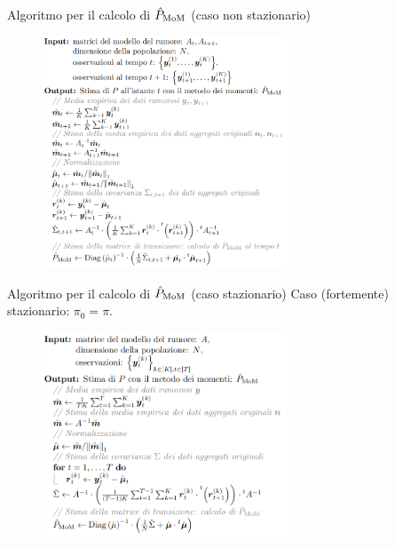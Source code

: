 \documentclass[10pt,xcolor={table,dvipsnames}]{beamer} 		%
\theoremstyle{plain}					%
\theoremstyle{definition}
\theoremstyle{remark}
\begin{document}
	\begin{frame}[fragile]
		{Algoritmo per il calcolo di $\hat{P}_{\textup{MoM}}$ {\smaller (caso non stazionario)}}

		\begin{figure}[ht]
			\centering
			\includegraphics[width=0.65\textwidth]{Immagini/algorithm_nonstationary.png}
		\end{figure}
		
	\end{frame}

	\begin{frame}[fragile]
		{Algoritmo per il calcolo di $\hat{P}_{\textup{MoM}}$ {\smaller (caso stazionario)}}
		Caso {\smaller (fortemente)} stazionario: $\pi_0=\pi$.

		\begin{figure}[ht]
			\centering
			\includegraphics[width=0.65\textwidth]{Immagini/algorithm_stationary.png}
		\end{figure}
		
	\end{frame}
\end{document}
